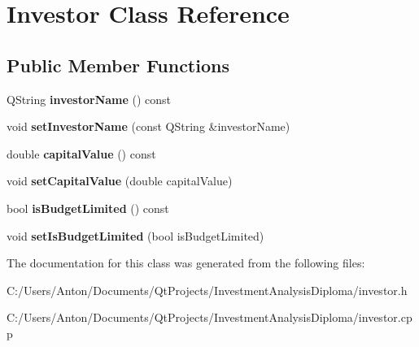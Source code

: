 \hypertarget{class_investor}{}\section{Investor Class Reference}
\label{class_investor}
\subsection*{Public Member Functions}
\begin{DoxyCompactItemize}
\item 
\hypertarget{class_investor_ad874fbf5a354055d747167e21da373a1}{}Q\+String {\bfseries investor\+Name} () const \label{class_investor_ad874fbf5a354055d747167e21da373a1}

\item 
\hypertarget{class_investor_a83705af5cad27d9030bd3c5816401c2a}{}void {\bfseries set\+Investor\+Name} (const Q\+String \&investor\+Name)\label{class_investor_a83705af5cad27d9030bd3c5816401c2a}

\item 
\hypertarget{class_investor_a2edb7323f5a27c404b40fb0df7c0441d}{}double {\bfseries capital\+Value} () const \label{class_investor_a2edb7323f5a27c404b40fb0df7c0441d}

\item 
\hypertarget{class_investor_aee6c071a2ca44f21e2b0939faa06ff1e}{}void {\bfseries set\+Capital\+Value} (double capital\+Value)\label{class_investor_aee6c071a2ca44f21e2b0939faa06ff1e}

\item 
\hypertarget{class_investor_a7a94c8a38c4ec39feff4e6408bf54817}{}bool {\bfseries is\+Budget\+Limited} () const \label{class_investor_a7a94c8a38c4ec39feff4e6408bf54817}

\item 
\hypertarget{class_investor_a93e6ad7d54c57b61e71481efa78fa3a3}{}void {\bfseries set\+Is\+Budget\+Limited} (bool is\+Budget\+Limited)\label{class_investor_a93e6ad7d54c57b61e71481efa78fa3a3}

\end{DoxyCompactItemize}


The documentation for this class was generated from the following files\+:\begin{DoxyCompactItemize}
\item 
C\+:/\+Users/\+Anton/\+Documents/\+Qt\+Projects/\+Investment\+Analysis\+Diploma/investor.\+h\item 
C\+:/\+Users/\+Anton/\+Documents/\+Qt\+Projects/\+Investment\+Analysis\+Diploma/investor.\+cpp\end{DoxyCompactItemize}
